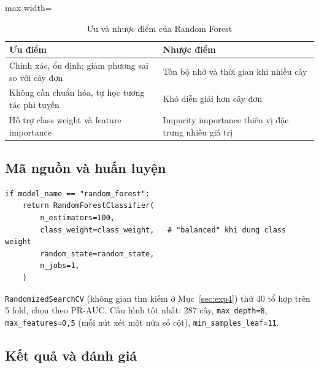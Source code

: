 \begin{table}[H]
\centering
\begin{adjustbox}{max width=\textwidth}
\begin{tabular}{|p{7cm}|p{7cm}|}
\hline
\textbf{Ưu điểm} & \textbf{Nhược điểm} \\
\hline
Chính xác, ổn định; giảm phương sai so với cây đơn & Tốn bộ nhớ và thời gian khi nhiều cây \\
\hline
Không cần chuẩn hóa, tự học tương tác phi tuyến & Khó diễn giải hơn cây đơn \\
\hline
Hỗ trợ class weight và feature importance & Impurity importance thiên vị đặc trưng nhiều giá trị \\
\hline
\end{tabular}
\end{adjustbox}
\caption{Ưu và nhược điểm của Random Forest}
\end{table}

\subsection{Mã nguồn và huấn luyện}
\begin{lstlisting}[style=pythonstyle, caption={Khởi tạo Random Forest trong \texttt{src/models.py}}]
if model_name == "random_forest":
    return RandomForestClassifier(
        n_estimators=100,
        class_weight=class_weight,   # "balanced" khi dung class weight
        random_state=random_state,
        n_jobs=1,
    )
\end{lstlisting}

\texttt{RandomizedSearchCV} (không gian tìm kiếm ở Mục~\ref{sec:exp4}) thử 40 tổ hợp trên 5 fold, chọn theo PR-AUC. Cấu hình tốt nhất: 287 cây, \texttt{max\_depth=8}, \texttt{max\_features=0,5} (mỗi nút xét một nửa số cột), \texttt{min\_samples\_leaf=11}.

\subsection{Kết quả và đánh giá}

